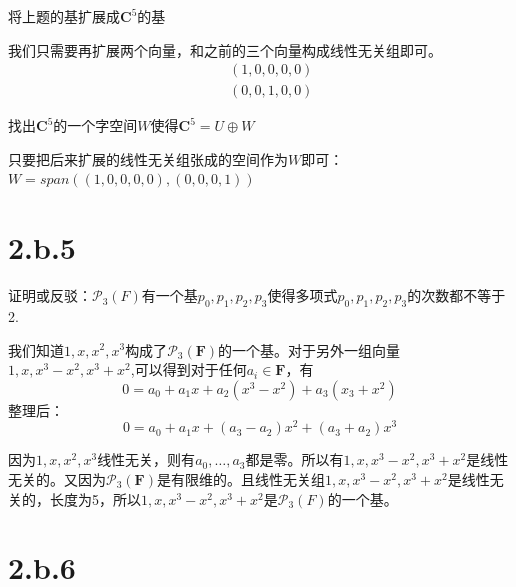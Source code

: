 \documentclass[10pt,a4paper,UTF8]{article}
\begin{document}
\begin{problem}
将上题的基扩展成\(\mathbf{C}^{5}\)的基
\end{problem}

\begin{answer}
我们只需要再扩展两个向量，和之前的三个向量构成线性无关组即可。
\begin{eqnarray*}
&&(1,0,0,0,0)\\
&&(0,0,1,0,0)
\end{eqnarray*}
\end{answer}

\begin{problem}
找出\(\mathbf{C}^{5}\)的一个字空间\(W\)使得\(\mathbf{C}^{5} = U \oplus W\)
\end{problem}

\begin{answer}
只要把后来扩展的线性无关组张成的空间作为\(W\)即可：
\(W= span((1,0,0,0,0),(0,0,0,1))\)
\end{answer}

\section*{2.b.5}
\label{sec:orgdc9b632}


\begin{problem}
证明或反驳：\(\mathcal{P}_{3}(F)\)有一个基\(p_{0},p_{1},p_{2},p_{3}\)使得多项式\(p_{0},p_{1},p_{2},p_{3}\)的次数都不等于2.
\end{problem}

\begin{answer}
我们知道\(1,x,x^{2},x^{3}\)构成了\(\mathcal{P}_{3}(\mathbf{F})\)的一个基。对于另外一组向量\(1,x,x^{3}-x^{2},x^{3}+x^{2}\),可以得到对于任何\(a_{i}\in \mathbf{F}\)，有
\begin{equation}
\label{eq:1}
0=a_{0} + a_{1} x + a_{2}(x^{3}-x^{2}) + a_{3}(x_{3}+x^{2})
\end{equation}
整理后：
\begin{equation}
\label{eq:2}
0=a_{0} + a_{1} x + (a_{3} - a_{2})x^{2} + (a_{3}+a_{2})x^{3}
\end{equation}

因为\(1,x,x^{2},x^{3}\)线性无关，则有\(a_{0},\ldots ,a_{3}\)都是零。所以有\(1,x,x^{3}-x^{2},x^{3}+x^{2}\)是线性无关的。又因为\(\mathcal{P}_{3}(\mathbf{F})\)是有限维的。且线性无关组\(1,x,x^{3}-x^{2},x^{3}+x^{2}\)是线性无关的，长度为5，所以\(1,x,x^{3}-x^{2},x^{3}+x^{2}\)是\(\mathcal{P}_{3}(F)\)的一个基。
\end{answer}
\section*{2.b.6}
\label{sec:org2326aa7}
\end{document}
